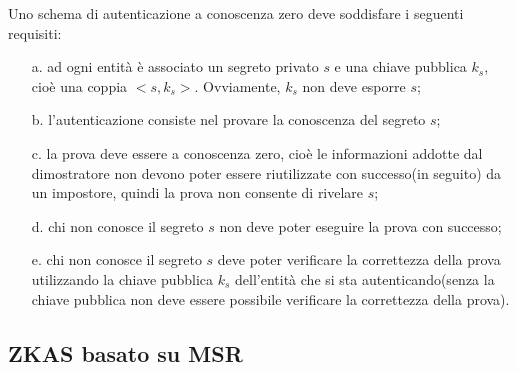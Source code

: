 Uno schema di autenticazione a conoscenza zero deve soddisfare i seguenti requisiti: \begin{itemize}
\item[a.] ad ogni entità è associato un segreto privato $s$ e
una chiave pubblica $k_{s}$, cioè una coppia $<s, k_{s}>$. Ovviamente, $k_{s}$ non deve esporre $s$;
\item[b.] l'autenticazione consiste nel provare la conoscenza del segreto $s$;
\item[c.] la prova deve essere a conoscenza zero, cioè le informazioni addotte dal dimostratore non devono poter essere riutilizzate con successo(in seguito) da un impostore, quindi la prova non consente di rivelare $s$;
\item[d.] chi non conosce il segreto $s$ non deve poter eseguire la prova con successo;
\item[e.] chi non conosce il segreto $s$ deve poter verificare la correttezza della prova utilizzando la chiave pubblica $k_{s}$ dell'entità che si sta autenticando(senza la chiave pubblica non deve essere possibile verificare la correttezza della prova).
\end{itemize}

\subsection{ZKAS basato su MSR}

